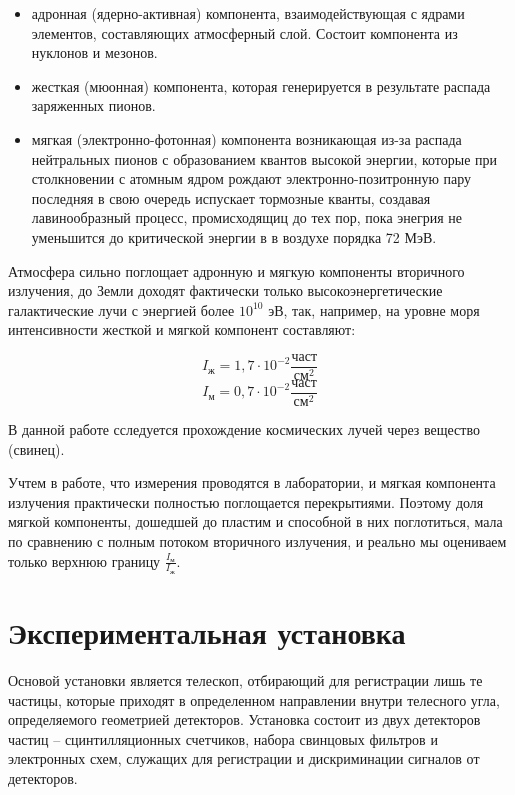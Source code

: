 \documentclass[15pt,a5paper,reqno]{article}
\begin{document}
\begin{itemize}
  \item адронная (ядерно-активная) компонента, взаимодействующая с ядрами элементов, составляющих атмосферный слой. Состоит компонента из нуклонов и мезонов.
  \item жесткая (мюонная) компонента, которая генерируется в результате распада заряженных пионов.
  \item мягкая (электронно-фотонная) компонента возникающая из-за распада нейтральных пионов с образованием квантов высокой энергии, которые при столкновении с атомным ядром рождают
  электронно-позитронную пару последняя в свою очередь испускает тормозные кванты, создавая лавинообразный процесс, промисходящиц до тех пор, пока энегрия не уменьшится до критической энергии в в воздухе порядка 72 МэВ.

\end{itemize}

Атмосфера сильно поглощает адронную и мягкую компоненты вторичного излучения, до Земли доходят фактически только высокоэнергетические галактические лучи с энергией более $10^{10}$ эВ, так, 
например, на уровне моря интенсивности жесткой и мягкой компонент составляют:

\[ I_ж = 1,7 \cdot 10^{-2} \text{$\frac{част}{см^{2}}$}  \]
\[ I_м = 0,7 \cdot 10^{-2} \text{$\frac{част}{см^{2}}$} \] 

В данной работе сследуется прохождение космических лучей через вещество (свинец).

Учтем в работе, что измерения проводятся в лаборатории, и мягкая компонента излучения практически полностью поглощается перекрытиями. Поэтому доля мягкой компоненты, 
дошедшей до пластим и способной в них поглотиться, мала по сравнению с полным потоком вторичного излучения, и реально мы оцениваем только верхнюю границу $\frac{I_м}{I_ж}$.

\section{Экспериментальная установка}

Основой установки является телескоп, отбирающий для регистрации лишь те частицы,
которые приходят в определенном направлении внутри телесного угла, определяемого
геометрией детекторов.
Установка состоит из двух детекторов частиц – сцинтилляционных счетчиков, набора
свинцовых фильтров и электронных схем, служащих для регистрации и дискриминации
сигналов от детекторов.
\end{document}

